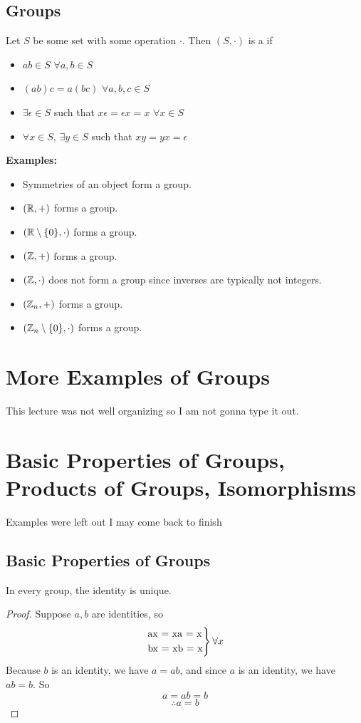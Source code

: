 \documentclass[openany]{report}
\begin{document}
\section{Groups}
Let $S$ be some set with some operation $\cdot$. Then $(S, \cdot)$ is a  if
\begin{itemize}
    \item \textbf{} $ab \in S$ $\forall a,b \in S$
    \item \textbf{} $(ab)c = a(bc)$  $\forall a,b,c \in S$
    \item \textbf{} $\exists \epsilon \in S$ such that $x\epsilon = \epsilon x = x$  $\forall x \in S$
    \item \textbf{} $\forall x \in S$, $\exists y \in S$ such that $xy = yx = \epsilon$
\end{itemize}
\textbf{Examples:}
\begin{itemize}
    \item Symmetries of an object form a group.
    \item $(\mathbb{R}, +)$ forms a group.
    \item $(\mathbb{R} \setminus \{0\}, \cdot)$ forms a group.
    \item $(\mathbb{Z}, +)$ forms a group.
    \item $(\mathbb{Z}, \cdot)$ does not form a group since inverses are typically not integers.
    \item $(\mathbb{Z}_n, +)$ forms a group.
    \item $(\mathbb{Z}_n \setminus \{0\}, \cdot)$ forms a group.
\end{itemize}
\chapter{More Examples of Groups}
This lecture was not well organizing so I am not gonna type it out.
\chapter{Basic Properties of Groups, Products of Groups, Isomorphisms}
Examples were left out I may come back to finish
\section{Basic Properties of Groups}
\begin{prop}
    In every group, the identity is unique.
\end{prop}
\begin{proof}
    Suppose $a,b$ are identities, so\\
    \[\begin{rcases}
        $ax = xa = x$\\
        $bx = xb = x$
    \end{rcases}\forall x
    \]
    Because $b$ is an identity, we have $a = ab$, and since $a$ is an identity, we have $ab = b$. So
    $$a = ab = b$$
    $$\therefore a = b$$
\end{proof}
\end{document}
